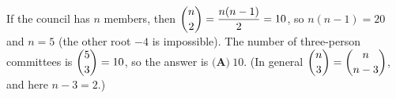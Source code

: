 If the council has $n$ members, then $\dbinom n2=\dfrac{n(n-1)}{2}=10$, so $n(n-1)=20$ and $n=5$ (the other root $-4$ is impossible). The number of three-person committees is $\dbinom53=10$, so the answer is $\boxed{\textbf{(A)}\ 10}$. (In general $\dbinom n3=\dbinom n{n-3}$, and here $n-3=2$.)

